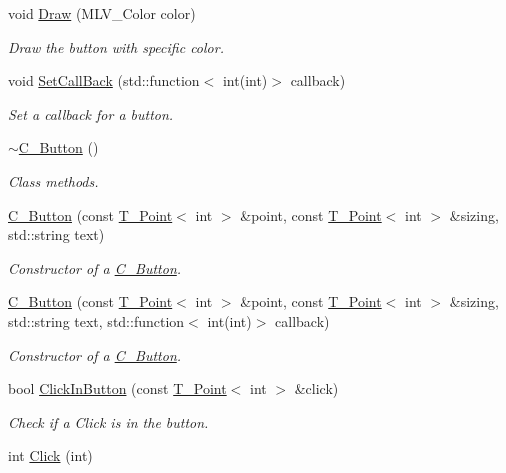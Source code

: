 \begin{DoxyCompactItemize}
void \hyperlink{classC__Button_a6c507d4567ca21676e9980f8cf3d26b5}{Draw} (M\+L\+V\+\_\+\+Color color)
\begin{DoxyCompactList}\small\item\em Draw the button with specific color. \end{DoxyCompactList}\item 
void \hyperlink{classC__Button_aedb01f3229d8176f6a9475cf2edae8f0}{Set\+Call\+Back} (std\+::function$<$ int(int)$>$ callback)
\begin{DoxyCompactList}\small\item\em Set a callback for a button. \end{DoxyCompactList}\item 
\hyperlink{classC__Button_a8581fb2ad14e232e97040388bdc992e4}{$\sim$\+C\+\_\+\+Button} ()
\begin{DoxyCompactList}\small\item\em Class methods. \end{DoxyCompactList}\item 
\hyperlink{classC__Button_a39291cec8e3a327343328f6fa1a3b3d9}{C\+\_\+\+Button} (const \hyperlink{classT__Point}{T\+\_\+\+Point}$<$ int $>$ \&point, const \hyperlink{classT__Point}{T\+\_\+\+Point}$<$ int $>$ \&sizing, std\+::string text)
\begin{DoxyCompactList}\small\item\em Constructor of a \hyperlink{classC__Button}{C\+\_\+\+Button}. \end{DoxyCompactList}\item 
\hyperlink{classC__Button_aed99ebc9be8ebd50a09c909eb95ec226}{C\+\_\+\+Button} (const \hyperlink{classT__Point}{T\+\_\+\+Point}$<$ int $>$ \&point, const \hyperlink{classT__Point}{T\+\_\+\+Point}$<$ int $>$ \&sizing, std\+::string text, std\+::function$<$ int(int)$>$ callback)
\begin{DoxyCompactList}\small\item\em Constructor of a \hyperlink{classC__Button}{C\+\_\+\+Button}. \end{DoxyCompactList}\item 
bool \hyperlink{classC__Button_a805c797b9afdddb5896a516a3e783882}{Click\+In\+Button} (const \hyperlink{classT__Point}{T\+\_\+\+Point}$<$ int $>$ \&click)
\begin{DoxyCompactList}\small\item\em Check if a Click is in the button. \end{DoxyCompactList}\item 
int \hyperlink{classC__Button_ac743591b5933dd95b571d5956c7d669b}{Click} (int)

\end{DoxyCompactItemize}
